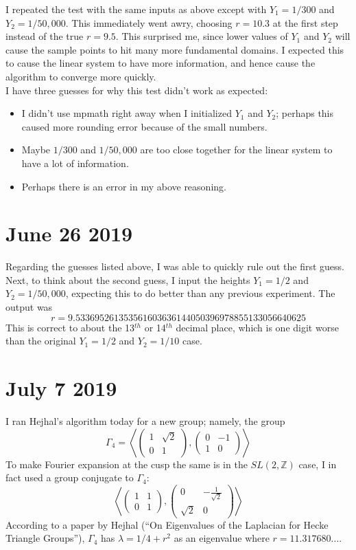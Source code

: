 \documentclass[]{article}
\begin{document}
I repeated the test with the same inputs as above except with $Y_1 = 1/300$ and $Y_2 = 1/50,000$.
This immediately went awry, choosing $r = 10.3$ at the first step instead of the true $r = 9.5$.
This surprised me, since lower values of $Y_1$ and $Y_2$ will cause the sample points to hit many more fundamental domains.
I expected this to cause the linear system to have more information, and hence cause the algorithm to converge more quickly.
\\

I have three guesses for why this test didn't work as expected:
\begin{itemize}
	\item I didn't use mpmath right away when I initialized $Y_1$ and $Y_2$; perhaps this caused more rounding error because of the small numbers.
	\item Maybe $1/300$ and $1/50,000$ are too close together for the linear system to have a lot of information.
	\item Perhaps there is an error in my above reasoning.
\end{itemize}

\section*{June 26 2019}

Regarding the guesses listed above, I was able to quickly rule out the first guess.
Next, to think about the second guess, I input the heights $Y_1 = 1/2$ and $Y_2 = 1/50,000$, expecting this to do better than any previous experiment.
The output was
$$
r = 9.533695261353561603636144050396978855133056640625
$$
This is correct to about the 13$^{th}$ or 14$^{th}$ decimal place, which is one digit worse than the original $Y_1 = 1/2$ and $Y_2 = 1/10$ case.

\section*{July 7 2019}

I ran Hejhal's algorithm today for a new group; namely, the group
\[
	\Gamma_4 = \left\langle 
	\begin{pmatrix}
		1 & \sqrt{2} \\
		0 & 1
	\end{pmatrix},
	\begin{pmatrix}
		0 & -1 \\
		1 & 0
	\end{pmatrix}	
	 \right\rangle
\]
To make Fourier expansion at the cusp the same is in the $SL(2, \mathbb{Z})$ case, I in fact used a group conjugate to $\Gamma_4$:
\[
	\left\langle 
	\begin{pmatrix}
		1 & 1 \\
		0 & 1
	\end{pmatrix},
	\begin{pmatrix}
		0 & -\frac{1}{\sqrt{2}} \\
		\sqrt{2} & 0
	\end{pmatrix}	
	\right\rangle
\]
According to a paper by Hejhal (``On Eigenvalues of the Laplacian for Hecke Triangle Groups''), $\Gamma_4$ has $\lambda = 1/4 + r^2$ as an eigenvalue where $r = 11.317680\dots$.
\end{document}
